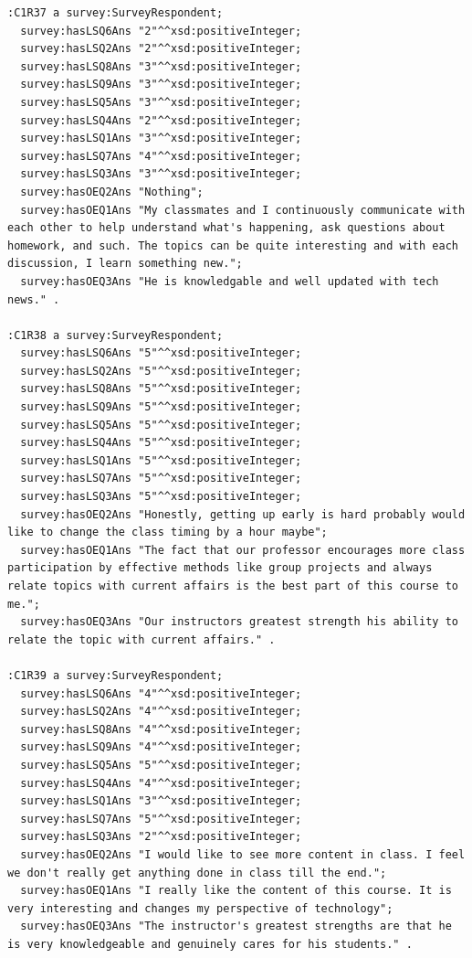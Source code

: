 \begin{lstlisting}
:C1R37 a survey:SurveyRespondent;
  survey:hasLSQ6Ans "2"^^xsd:positiveInteger;
  survey:hasLSQ2Ans "2"^^xsd:positiveInteger;
  survey:hasLSQ8Ans "3"^^xsd:positiveInteger;
  survey:hasLSQ9Ans "3"^^xsd:positiveInteger;
  survey:hasLSQ5Ans "3"^^xsd:positiveInteger;
  survey:hasLSQ4Ans "2"^^xsd:positiveInteger;
  survey:hasLSQ1Ans "3"^^xsd:positiveInteger;
  survey:hasLSQ7Ans "4"^^xsd:positiveInteger;
  survey:hasLSQ3Ans "3"^^xsd:positiveInteger;
  survey:hasOEQ2Ans "Nothing";
  survey:hasOEQ1Ans "My classmates and I continuously communicate with each other to help understand what's happening, ask questions about homework, and such. The topics can be quite interesting and with each discussion, I learn something new.";
  survey:hasOEQ3Ans "He is knowledgable and well updated with tech news." .

:C1R38 a survey:SurveyRespondent;
  survey:hasLSQ6Ans "5"^^xsd:positiveInteger;
  survey:hasLSQ2Ans "5"^^xsd:positiveInteger;
  survey:hasLSQ8Ans "5"^^xsd:positiveInteger;
  survey:hasLSQ9Ans "5"^^xsd:positiveInteger;
  survey:hasLSQ5Ans "5"^^xsd:positiveInteger;
  survey:hasLSQ4Ans "5"^^xsd:positiveInteger;
  survey:hasLSQ1Ans "5"^^xsd:positiveInteger;
  survey:hasLSQ7Ans "5"^^xsd:positiveInteger;
  survey:hasLSQ3Ans "5"^^xsd:positiveInteger;
  survey:hasOEQ2Ans "Honestly, getting up early is hard probably would like to change the class timing by a hour maybe";
  survey:hasOEQ1Ans "The fact that our professor encourages more class participation by effective methods like group projects and always relate topics with current affairs is the best part of this course to me.";
  survey:hasOEQ3Ans "Our instructors greatest strength his ability to relate the topic with current affairs." .

:C1R39 a survey:SurveyRespondent;
  survey:hasLSQ6Ans "4"^^xsd:positiveInteger;
  survey:hasLSQ2Ans "4"^^xsd:positiveInteger;
  survey:hasLSQ8Ans "4"^^xsd:positiveInteger;
  survey:hasLSQ9Ans "4"^^xsd:positiveInteger;
  survey:hasLSQ5Ans "5"^^xsd:positiveInteger;
  survey:hasLSQ4Ans "4"^^xsd:positiveInteger;
  survey:hasLSQ1Ans "3"^^xsd:positiveInteger;
  survey:hasLSQ7Ans "5"^^xsd:positiveInteger;
  survey:hasLSQ3Ans "2"^^xsd:positiveInteger;
  survey:hasOEQ2Ans "I would like to see more content in class. I feel we don't really get anything done in class till the end.";
  survey:hasOEQ1Ans "I really like the content of this course. It is very interesting and changes my perspective of technology";
  survey:hasOEQ3Ans "The instructor's greatest strengths are that he is very knowledgeable and genuinely cares for his students." .


\end{lstlisting}
